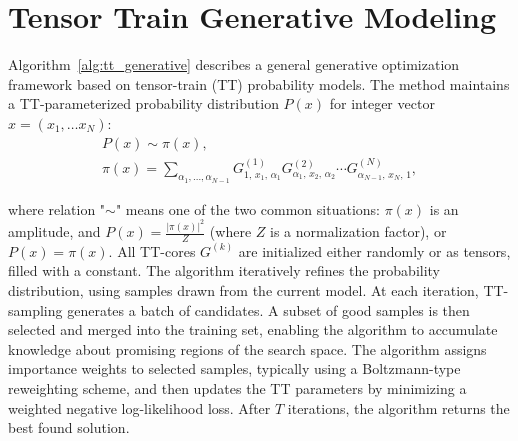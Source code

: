 \documentclass{article}
\theoremstyle{plain}
\theoremstyle{definition}
\theoremstyle{remark}
\begin{document}
\section{Tensor Train Generative Modeling }
\label{sec:generative}

Algorithm~\ref{alg:tt_generative} describes a general generative optimization framework based on tensor-train (TT) probability models. The method maintains a TT-parameterized probability distribution $P(x)$ for integer vector $x = (x_1,\dots x_N)$:
\begin{equation}
\begin{gathered}
P(x) \sim \pi(x), \\
    \pi(x) =
\sum_{\alpha_1,\dots,\alpha_{N-1}}
G^{(1)}_{1,\,x_1,\,\alpha_1}
G^{(2)}_{\alpha_1,\,x_2,\,\alpha_2}
\cdots
G^{(N)}_{\alpha_{N-1},\,x_N,\,1},
\label{eq:tt-def}
\end{gathered}
\end{equation}

where relation "$\sim$" means one of the two common situations: $\pi(x)$ is an amplitude, and $P(x)=\frac{|\pi(x)|^2}{Z}$ (where $Z$ is a normalization factor), or $P(x)=\pi(x)$.
All TT-cores $G^{(k)}$ are initialized either randomly or as tensors, filled with a constant. The algorithm iteratively refines the probability distribution,  using samples drawn from the current model. 
At each iteration, TT-sampling generates a batch of candidates.
A subset of good samples is then selected and merged into the training set, enabling the algorithm to accumulate knowledge about promising regions of the search space. 
The algorithm assigns importance weights to selected samples, typically using a Boltzmann-type reweighting scheme, and then updates the TT parameters by minimizing a weighted negative log-likelihood loss.
After $T$ iterations, the algorithm returns the best found solution.
\end{document}
